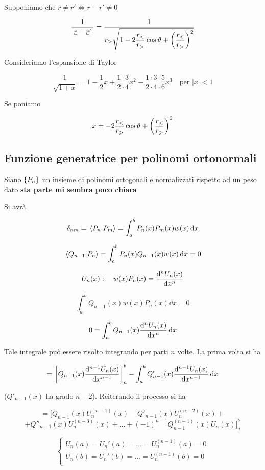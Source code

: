 Supponiamo che $\underline{r} \neq \underline{r}' \iff \underline{r} - \underline{r}' \neq 0$

$$\frac{1}{| \underline{r} - \underline{r}' |}
=\frac{1}{r_{>} \displaystyle \sqrt{1 - 2\frac{r_{<}}{r_{>}} \cos{\vartheta} + \qty(\frac{r_{<}}{r_{>}})^2}}$$

Consideriamo l'espansione di Taylor

$$\frac{1}{\sqrt{1 + x}}=1 - \frac{1}{2}x + \frac{1 \cdot 3}{2 \cdot 4} x^2 - \frac{1 \cdot 3 \cdot 5}{2 \cdot 4 \cdot 6} x^3
\quad \text{per } |x|<1$$

Se poniamo

$$x=- 2\frac{r_{<}}{r_{>}} \cos{\vartheta} + \qty(\frac{r_{<}}{r_{>}})^2$$

\subsection{Funzione generatrice per polinomi ortonormali}

Siano $\qty{P_n}$ un insieme di polinomi ortogonali e normalizzati rispetto ad un peso dato \textbf{sta parte mi sembra poco chiara}

Si avrà

$$\delta_{nm}=\braket*{P_n}{P_m}
=\int_{a}^{b} P_n(x) P_m(x) w(x) \dd{x}$$

$$\braket*{Q_{n-1}}{P_n}
=\int_{a}^{b} P_n(x) Q_{n-1}(x) w(x) \dd{x}=0$$

$$U_n(x): \quad w(x) P_n(x)=\dv[n]{U_n(x)}{x}$$

$$\int_{a}^{b} Q_{n-1}(x) w(x) P_n(x) \dd{x}=0$$

$$0=\int_{a}^{b} Q_{n-1}(x) \dv[n]{U_n(x)}{x} \dd{x}$$

Tale integrale può essere risolto integrando per parti $n$ volte. La prima volta si ha

$$=\qty[Q_{n-1}(x) \dv[n-1]{U_n(x)}{x}]_{a}^{b}
- \int_{a}^{b} Q'_{n-1}(x) \dv[n-1]{U_n(x)}{x} \dd{x}$$

($Q'_{n-1}(x)$ ha grado $n-2$). Reiterando il processo si ha

$$=\Big[ Q_{n-1}(x) U_n^{(n-1)}(x) - Q'_{n-1}(x) U_n^{(n-2)}(x) + $$
$$+Q''_{n-1}(x) U_n^{(n-3)}(x) + \ldots + (-1)^{n-1} Q^{(n-1)}_{n-1}(x) U_n(x) \Big]_{a}^{b}$$

$$\begin{cases}
   U_n(a)=U_n'(a)=\ldots=U_n^{(n-1)}(a)=0\\[0.1cm]
   U_n(b)=U_n'(b)=\ldots=U_n^{(n-1)}(b)=0\\
\end{cases}$$

